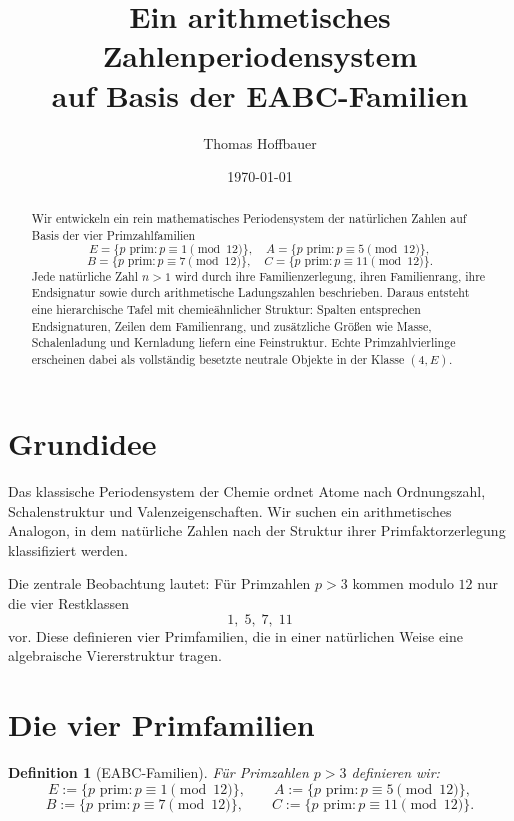 \documentclass[12pt,a4paper]{article}
\title{\textbf{Ein arithmetisches Zahlenperiodensystem\\
		auf Basis der EABC-Familien}}
\author{Thomas Hoffbauer}
\date{\today}
\newtheorem{definition}[satz]{Definition}
\begin{document}
	\maketitle
	
	\begin{abstract}
		Wir entwickeln ein rein mathematisches Periodensystem der natürlichen Zahlen auf Basis der vier Primzahlfamilien
		\[
		E=\{p\text{ prim}: p\equiv 1\!\!\pmod{12}\},\quad
		A=\{p\text{ prim}: p\equiv 5\!\!\pmod{12}\},
		\]
		\[
		B=\{p\text{ prim}: p\equiv 7\!\!\pmod{12}\},\quad
		C=\{p\text{ prim}: p\equiv 11\!\!\pmod{12}\}.
		\]
		Jede natürliche Zahl $n>1$ wird durch ihre Familienzerlegung, ihren Familienrang, ihre Endsignatur sowie durch arithmetische Ladungszahlen beschrieben. Daraus entsteht eine hierarchische Tafel mit chemieähnlicher Struktur: Spalten entsprechen Endsignaturen, Zeilen dem Familienrang, und zusätzliche Größen wie Masse, Schalenladung und Kernladung liefern eine Feinstruktur. Echte Primzahlvierlinge erscheinen dabei als vollständig besetzte neutrale Objekte in der Klasse $(4,E)$.
	\end{abstract}
	
	\tableofcontents
	\bigskip
	
	\section{Grundidee}
	
	Das klassische Periodensystem der Chemie ordnet Atome nach Ordnungszahl, Schalenstruktur und Valenzeigenschaften. Wir suchen ein arithmetisches Analogon, in dem natürliche Zahlen nach der Struktur ihrer Primfaktorzerlegung klassifiziert werden.
	
	Die zentrale Beobachtung lautet: Für Primzahlen $p>3$ kommen modulo $12$ nur die vier Restklassen
	\[
	1,\;5,\;7,\;11
	\]
	vor. Diese definieren vier Primfamilien, die in einer natürlichen Weise eine algebraische Viererstruktur tragen.
	
	\section{Die vier Primfamilien}
	
	\begin{definition}[EABC-Familien]
		Für Primzahlen $p>3$ definieren wir:
		\[
		E:=\{p\text{ prim}: p\equiv 1\pmod{12}\},
		\qquad
		A:=\{p\text{ prim}: p\equiv 5\pmod{12}\},
		\]
		\[
		B:=\{p\text{ prim}: p\equiv 7\pmod{12}\},
		\qquad
		C:=\{p\text{ prim}: p\equiv 11\pmod{12}\}.
		\]
	\end{definition}
	
\end{document}
